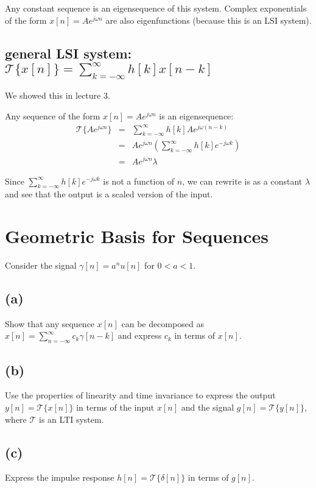 \documentclass[11pt]{article}
\begin{document}
{\color{blue}
Any constant sequence is an eigensequence of this system. Complex exponentials of the form $x[n] = Ae^{j\omega n}$ are also eigenfunctions (because this is an LSI system).
}

\subsection{general LSI system: $\mathcal{T}\{x[n]\}=\sum\limits_{k=-\infty}^\infty h[k]x[n-k]$}

{\color{blue}
We showed this in lecture 3.

Any sequence of the form $x[n] = Ae^{j\omega n}$ is an eigensequence:
\begin{eqnarray*}
\mathcal{T}\{Ae^{j\omega n}\}&=&\sum\limits_{k=-\infty}^\infty h[k]Ae^{j\omega (n-k)} \\
&=& Ae^{j\omega n} \left(\sum\limits_{k=-\infty}^\infty h[k]e^{-j\omega k} \right) \\
&=& Ae^{j\omega n} \lambda 
\end{eqnarray*}

Since $\sum\limits_{k=-\infty}^\infty h[k]e^{-j\omega k}$ is not a function of $n$, we can rewrite is as a constant $\lambda$ and see that the output is a scaled version of the input.
}

\section{Geometric Basis for Sequences}
Consider the signal $\gamma[n]=a^nu[n]$ for $0<a<1$. 

\subsection*{(a)} 
Show that any sequence $x[n]$ can be decomposed as $x[n]=\sum\limits_{n=-\infty}^\infty c_k \gamma[n-k]$ and express $c_k$ in terms of $x[n]$. 

\subsection*{(b)} 
Use the properties of linearity and time invariance to express the output $y[n] = \mathcal{T}\{x[n]\}$ in terms of the input $x[n]$ and the signal $g[n]=\mathcal{T}\{y[n]\}$, where $\mathcal{T}$ is an LTI system.

\subsection*{(c)} 
Express the impulse response $h[n]=\mathcal{T}\{\delta[n]\}$ in terms of $g[n]$.
\end{document}
